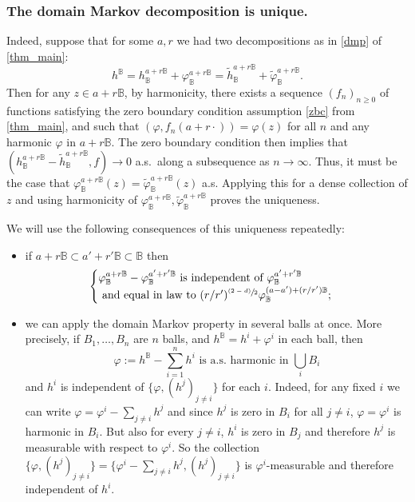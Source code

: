 \documentclass[10pt]{amsart}
\newcommand{\psfrac}[2]{\sfrac{(#1)}{#2}}
\theoremstyle{definition}
\newcommand{\B}{\mathbb{B}}\let\D\B\let\Ub\B
\begin{document}
\subsubsection*{The domain Markov decomposition is unique.} Indeed, suppose that for some $a,r$ we had two decompositions as in \eqref{dmp} of \cref{thm_main}:
\[
h^\B=h_\B^{a+r\B}+\varphi_\B^{a+r\B}=\tilde{h}_\B^{a+r\B}+\tilde{\varphi}_\B^{a+r\B}.
\]
Then for any $z\in a+r\B$, by harmonicity, there exists a sequence $(f_n)_{n\ge 0}$ of functions satisfying the zero boundary condition assumption \eqref{zbc} from \cref{thm_main}, and such that $(\varphi,f_n(a+r\cdot))=\varphi(z)$ for all $n$ and any harmonic $\varphi$ in $a+r\B$. The zero boundary condition then implies that $(h_\B^{a+r\B}-\tilde{h}_\B^{a+r\B},f)\to 0$ a.s.\ along a subsequence as $n\to \infty$. Thus, it must be the case that $\varphi_\B^{a+r\B}(z)=\tilde{\varphi}_\B^{a+r\B}(z)$ a.s. Applying this for a dense collection of $z$ and using harmonicity of $\varphi_\B^{a+r\B},\tilde{\varphi}_\B^{a+r\B}$ proves the uniqueness.

We will use the following consequences of this uniqueness repeatedly:
\begin{itemize}
\item if $a+r\B \subset a'+r'\B\subset \B$ then
\begin{equation}\label{eq:it_dmp}
\begin{cases}
\varphi_\B^{a+r\B}-\varphi_\B^{a'+r'\B} \text{ is independent of } \varphi_{\B}^{a'+r'\B}\\
\text{ and equal in law to } (r/r')^{\psfrac{2-d}{2}}\varphi_\B^{(a-a')+(r/r')\B};
\end{cases}
\end{equation}
\item
we can apply the domain Markov property in several balls at once. More precisely, if $B_1,\dots, B_n$ are $n$ balls, and $h^\B=h^i+\varphi^i$ in each ball, then
\begin{equation}
\label{eq:multidmp}
\varphi:=h^\B - \sum_{i=1}^n h^i \text{ is a.s.\ harmonic in } \bigcup_{i}B_i
\end{equation} and $h^i$ is independent of $\{\varphi,(h^j)_{j\ne i}\}$ for each $i$. Indeed, for any fixed $i$ we can write $\varphi=\varphi^i-\sum_{j\ne i}h^j$ and since $h^j$ is zero in $B_i$ for all $j\ne i$, $\varphi=\varphi^i$ is harmonic in $B_i$. But also for every $j\ne i$, $h^i$ is zero in $B_j$ and therefore $h^j$ is measurable with respect to $\varphi^i$. So the collection $\{\varphi,(h^j)_{j\ne i}\}=\{\varphi^i-\sum_{j\ne i} h^j,(h^j)_{j\ne i}\}$ is $\varphi^i$-measurable and therefore independent of $h^i$.
\end{itemize}
\end{document}
